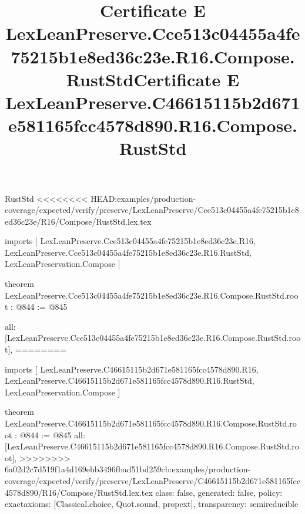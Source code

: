 \begin{lexlean}{RustStd}
<<<<<<<< HEAD:examples/production-coverage/expected/verify/preserve/LexLeanPreserve/Cce513c04455a4fe75215b1e8ed36c23e/R16/Compose/RustStd.lex.tex
\title{Certificate E LexLeanPreserve.Cce513c04455a4fe75215b1e8ed36c23e.R16.Compose.RustStd}
\begin{coremodule}
imports [
  LexLeanPreserve.Cce513c04455a4fe75215b1e8ed36c23e.R16,
  LexLeanPreserve.Cce513c04455a4fe75215b1e8ed36c23e.R16.RustStd,
  LexLeanPreservation.Compose
]

theorem LexLeanPreserve.Cce513c04455a4fe75215b1e8ed36c23e.R16.Compose.RustStd.root : @844 := @845 {
  all: [LexLeanPreserve.Cce513c04455a4fe75215b1e8ed36c23e.R16.Compose.RustStd.root],
========
\title{Certificate E LexLeanPreserve.C46615115b2d671e581165fcc4578d890.R16.Compose.RustStd}
\begin{coremodule}
imports [
  LexLeanPreserve.C46615115b2d671e581165fcc4578d890.R16,
  LexLeanPreserve.C46615115b2d671e581165fcc4578d890.R16.RustStd,
  LexLeanPreservation.Compose
]

theorem LexLeanPreserve.C46615115b2d671e581165fcc4578d890.R16.Compose.RustStd.root : @844 := @845 {
  all: [LexLeanPreserve.C46615115b2d671e581165fcc4578d890.R16.Compose.RustStd.root],
>>>>>>>> 6a02d2c7d519f1a4d169ebb3496fbad51bd259cb:examples/production-coverage/expected/verify/preserve/LexLeanPreserve/C46615115b2d671e581165fcc4578d890/R16/Compose/RustStd.lex.tex
  class: false,
  generated: false,
  policy: exact{axioms: [Classical.choice, Quot.sound, propext]},
  transparency: semireducible
}


\end{coremodule}}
\end{coremodule}
\end{lexlean}
